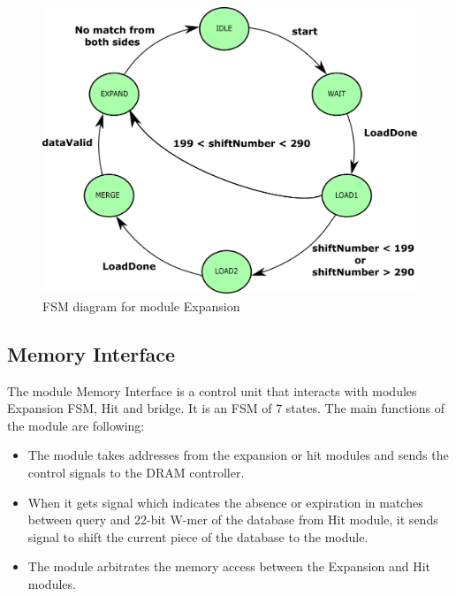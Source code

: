 \begin{figure}[t!]
\centering
\includegraphics[width=\columnwidth]{Figures/expandFSM.pdf}
\caption{FSM diagram for module Expansion} \label{fig:expandFSM}
\end{figure}
       
       
\subsection{Memory Interface}
The module Memory Interface is a control unit that interacts with modules Expansion FSM, Hit and bridge. 
It is an FSM of 7 states. The main functions of the module are following:
\begin{itemize}
\item The module takes addresses from the expansion or hit modules and sends the control signals to the DRAM controller.
\item When it gets signal which indicates the absence or expiration in matches between query and 22-bit W-mer of the database from Hit module, it sends signal to shift the current piece of the database to the module.
\item The module arbitrates the memory access between the Expansion and Hit modules. 
\end{itemize}



